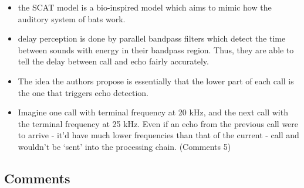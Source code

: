 \documentclass[
]{book}
\providecommand{\tightlist}{%
  \setlength{\itemsep}{0pt}\setlength{\parskip}{0pt}}
\begin{document}
\begin{itemize}
\tightlist
\item
  the SCAT model is a bio-inspired model which aims to mimic how the auditory system of bats work.
\item
  delay perception is done by parallel bandpass filters which detect the time between sounds with energy in their bandpass region. Thus, they are able to tell the delay between call and echo fairly accurately.
\item
  The idea the authors propose is essentially that the lower part of each call is the one that triggers echo detection.
\item
  Imagine one call with terminal frequency at 20 kHz, and the next call with the terminal frequency at 25 kHz. Even if an echo from the previous call were to arrive - it'd have much lower frequencies than that of the current - call and wouldn't be `sent' into the processing chain. (\protect\hypertarget{com_ming}{}{Comments 5})
\end{itemize}

\hypertarget{com_ming}{%
\subsection{Comments}\label{com_ming}}
\end{document}
